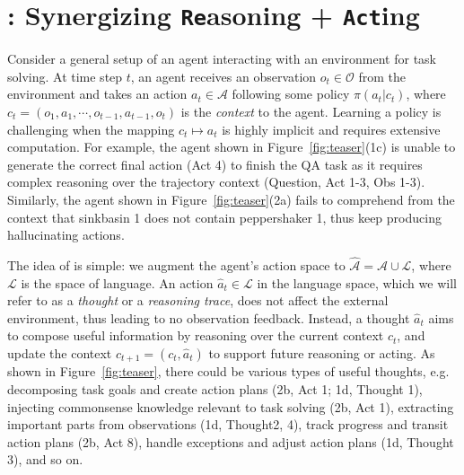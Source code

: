 \section{\model{}: Synergizing \texttt{Re}asoning + \texttt{Act}ing}
\label{sec:react}








Consider a general setup of an agent interacting with an environment for task solving. At time step $t$, an agent receives an observation $o_t \in \mathcal{O}$ from the environment and takes an action $a_t \in \mathcal{A}$ following some policy $\pi(a_t | c_t)$, where $c_t = (o_1, a_1, \cdots, o_{t-1}, a_{t-1}, o_t)$ is the \textit{context} to the agent. Learning a policy is challenging when the mapping $c_t \mapsto a_t$ is highly implicit and requires extensive computation. 
For example, the agent shown in Figure~\ref{fig:teaser}(1c) is unable to generate the correct final action (Act 4) to finish the QA task as it requires complex reasoning over the trajectory context (Question, Act 1-3, Obs 1-3).
Similarly, the agent shown in Figure~\ref{fig:teaser}(2a) fails to comprehend from the context that sinkbasin 1 does not contain peppershaker 1, thus keep producing hallucinating actions.


The idea of \model{} is simple: we augment the agent's action space to $\mathcal{\hat{A}} = \mathcal{A} \cup \mathcal{L}$, where $\mathcal{L}$ is the space of language. An action $\hat{a}_t \in \mathcal{L}$ in the language space, which we will refer to as a \textit{thought} or a \textit{reasoning trace}, does not affect the external environment, thus leading to no observation feedback. Instead, a thought $\hat{a}_t$ aims to compose useful information by reasoning over the current context $c_t$, and update the context $c_{t+1} = (c_t, \hat{a}_t)$ to support future reasoning or acting. 
As shown in Figure~\ref{fig:teaser}, there could be various types of useful thoughts, e.g.\,decomposing task goals and create action plans (2b, Act 1; 1d, Thought 1), injecting commonsense knowledge relevant to task solving (2b, Act 1), extracting important parts from observations (1d, Thought2, 4), track progress and transit action plans (2b, Act 8), handle exceptions and adjust action plans (1d, Thought 3), and so on. 


